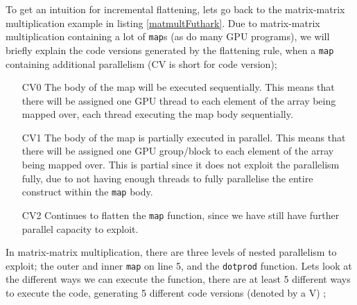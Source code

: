 To get an intuition for incremental flattening, lets go back to the matrix-matrix multiplication example in listing \ref{matmultFuthark}. Due to matrix-matrix multiplication containing a lot of \texttt{map}s (as do many GPU programs), we will briefly explain the code versions generated by the flattening rule, when a \texttt{map} containing additional parallelism (CV is short for code version); 
\begin{itemize}
\item[CV0] The body of the map will be executed sequentially. This means that there will be assigned one GPU thread to each element of the array being mapped over, each thread executing the map body sequentially.
\item[CV1] The body of the map is partially executed in parallel. This means that there will be assigned one GPU group/block to each element of the array being mapped over. This is partial since it does not exploit the parallelism fully, due to not having enough threads to fully parallelise the entire construct within the \texttt{map} body.
\item[CV2] Continues to flatten the \texttt{map} function, since we have still have further parallel capacity to exploit.  
\end{itemize}
\begin{center}
	\centering 
	
	\label{maptree}
\end{center}
In matrix-matrix multiplication, there are three levels of nested parallelism to exploit; the outer and inner \texttt{map} on line 5, and the \texttt{dotprod} function. Lets look at the different ways we can execute the function, there are at least 5 different ways to execute the code, generating 5 different code versions (denoted by a V) \cite{inc-flat};
